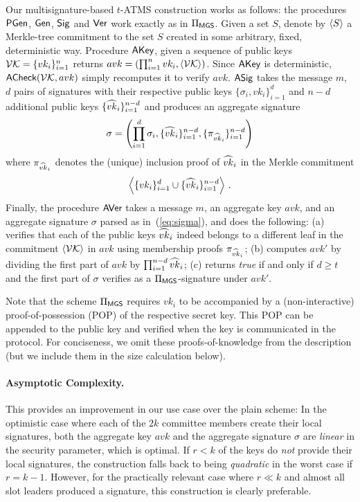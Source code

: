 Our multisignature-based $t$-ATMS construction works as follows: the procedures $\textsf{PGen}$,
$\mathsf{Gen}$, $\mathsf{Sig}$ and $\mathsf{Ver}$ work exactly as in $\Pi_{\textsf{MGS}}$.
Given a  set $S$, denote by $\left\langle S \right\rangle$ a Merkle-tree commitment to the set $S$ created
 in some arbitrary, fixed, deterministic way.
%
Procedure $\textsf{AKey}$, given a sequence
of public keys $\mathcal{VK}=\{vk_i\}_{i=1}^{n}$ returns
$avk=(\prod_{i=1}^{n}vk_i,\left\langle \mathcal{VK} \right\rangle)$.
%
Since $\textsf{AKey}$ is deterministic, $\textsf{ACheck}(\mathcal{VK},avk)$ simply recomputes it
to verify $avk$.
%
$\textsf{ASig}$ takes the message $m$, $d$ pairs of signatures with their respective public keys
$\{\sigma_i,vk_i\}_{i=1}^{d}$ and $n-d$ additional public keys
$\{\widehat{vk}_i\}_{i=1}^{n-d}$ and produces an aggregate signature
\begin{equation}
  \label{eq:sigma}
\sigma =
\left(
  \prod_{i=1}^{d}\sigma_i,
  \{\widehat{vk}_i\}_{i=1}^{n-d},
  \{\pi_{\widehat{vk}_i}\}_{i=1}^{n-d}
\right)
\end{equation}
where $\pi_{\widehat{vk}_i}$ denotes the (unique) inclusion proof of $\widehat{vk}_i$ in the
Merkle commitment
\[
  \left\langle \{vk_i\}_{i=1}^{d}\cup\{\widehat{vk}_i\}_{i=1}^{n-d} \right\rangle\,.
\]
%
Finally, the procedure $\textsf{AVer}$ takes
a message $m$,
an aggregate key $avk$,
and an aggregate signature $\sigma$ parsed as in~(\ref{eq:sigma}),
and does the following:
(a) verifies that each of the public keys $\widehat{vk}_i$ indeed belongs to a different
leaf in the commitment $\left\langle \mathcal{VK} \right\rangle$ in $avk$ using membership proofs
$\pi_{\widehat{vk}_i}$;
(b) computes $avk'$ by dividing the first part of $avk$ by
$\prod_{i=1}^{n-d}\widehat{vk}_i$;
(c) returns \emph{true} if and only if $d\geq t$ and the first part of $\sigma$
verifies as a $\Pi_{\textsf{MGS}}$-signature under $avk'$.

Note that  the scheme $\Pi_{\textsf{MGS}}$ requires $vk_i$ to be  accompanied by a (non-interactive)
proof-of-possession (POP) \cite{pop} of the respective secret key.  This POP can be
appended to the public key and verified when the key is communicated in the
protocol.  For conciseness, we omit these proofs-of-knowledge from the
description (but we include them in the size calculation below).

\paragraph{Asymptotic Complexity.}
This provides an improvement in our use case over the plain scheme:
In the optimistic case where each of the
$2k$ committee members create their local signatures,
both the aggregate key $avk$ and the aggregate signature $\sigma$ are
\emph{linear} in the security parameter, which is optimal.
If %
$r<k$ of the keys do \emph{not} provide their local signatures,  the construction falls back
to being \emph{quadratic} in the worst case if $r = k - 1$.
However, for the
practically relevant case where
$r \ll k$ and almost all slot leaders produced a signature, this construction is
clearly preferable.

